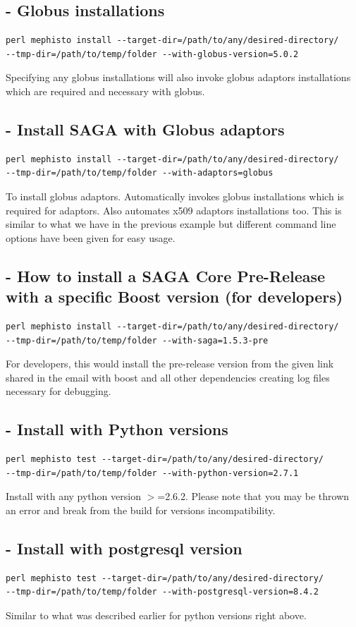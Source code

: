 \documentclass[a4paper,10pt]{article}
\begin{document}
\subsection*{- Globus installations}
\begin{verbatim}
perl mephisto install --target-dir=/path/to/any/desired-directory/ 
--tmp-dir=/path/to/temp/folder --with-globus-version=5.0.2
\end{verbatim}
Specifying any globus installations will also invoke globus adaptors
installations which are required and necessary with globus.
\subsection*{- Install SAGA with Globus adaptors}
\begin{verbatim}
perl mephisto install --target-dir=/path/to/any/desired-directory/ 
--tmp-dir=/path/to/temp/folder --with-adaptors=globus
\end{verbatim}
To install globus adaptors. Automatically invokes globus installations which 
is required for adaptors. Also automates x509 adaptors installations too.
This is similar to what we have in the previous example but different 
command line options have been given for easy usage.  
\subsection*{- How to install a SAGA Core Pre-Release with a specific Boost version (for developers)}
\begin{verbatim}
perl mephisto install --target-dir=/path/to/any/desired-directory/ 
--tmp-dir=/path/to/temp/folder --with-saga=1.5.3-pre
\end{verbatim}
For developers, this would install the pre-release version from the given 
link shared in the email with boost and all other dependencies creating log 
files necessary for debugging. 
\subsection*{- Install with Python versions}
\begin{verbatim}
perl mephisto test --target-dir=/path/to/any/desired-directory/ 
--tmp-dir=/path/to/temp/folder --with-python-version=2.7.1
\end{verbatim}
Install with any python version $>$=2.6.2. Please note that you may 
be thrown an error and break from the build for versions incompatibility.
\subsection*{- Install with postgresql version}
\begin{verbatim}
perl mephisto test --target-dir=/path/to/any/desired-directory/ 
--tmp-dir=/path/to/temp/folder --with-postgresql-version=8.4.2
\end{verbatim}
Similar to what was described earlier for python versions right above.
\end{document}
